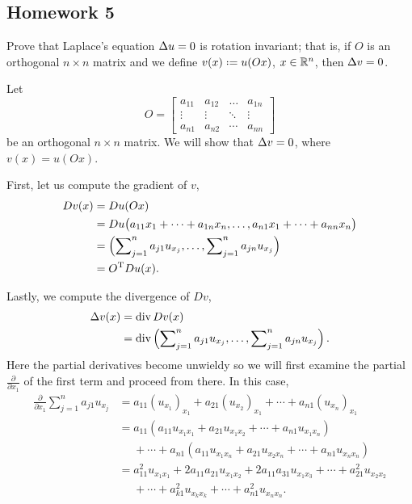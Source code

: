 \subsection{Homework 5}
\begin{problem}
  Prove that Laplace's equation \(\Delta u=0\) is rotation invariant; that
  is, if \(O\) is an orthogonal \(n\times n\) matrix and we define
  \(v(x)\defeq u(Ox)\), \(x\in\mathbb{R}^n\), then \(\Delta v=0\).
\end{problem}
\begin{solution*}
  Let
  \[
    O=
    \begin{bmatrix}
      a_{11}&a_{12}&\dotsc&a_{1n}\\
      \vdots&\vdots&\ddots&\vdots\\
      a_{n1}&a_{n2}&\cdots&a_{nn}
    \end{bmatrix}
  \]
  be an orthogonal \(n\times n\) matrix. We will show that \(\Delta v=0\),
  where \(v(x)=u(Ox)\).

  First, let us compute the gradient of \(v\),
  \begin{align*}
    Dv(x)
    &=Du(Ox)\\
    &=Du\bigl(a_{11}x_1+\dotsb+a_{1n}x_n,\dotsc,a_{n1}x_1+\dotsb+a_{nn}x_n\bigr)\\
    &=\left(\sum\nolimits_{j=1}^na_{j1}u_{x_j},%
      \dotsc,%
      \sum\nolimits_{j=1}^n a_{jn}u_{x_j}\right)\\
    &=O^\rmT Du(x).
  \end{align*}

  Lastly, we compute the divergence of \(Dv\),
  \begin{align*}
    \Lap v(x)
    &=\Div Dv(x)\\
    &=\Div%
      \left(\sum\nolimits_{j=1}^na_{j1}u_{x_j},%
      \dotsc,%
      \sum\nolimits_{j=1}^n a_{jn}u_{x_j}\right).
  \end{align*}
  Here the partial derivatives become unwieldy so we will first examine the
  partial \(\frac{\partial}{\partial x_1}\) of the first term and proceed
  from there. In this case,
  \begin{align*}
    \frac{\partial}{\partial x_1}\sum_{j=1}^n a_{j1}u_{x_j}
    &=a_{11}(u_{x_1})_{x_1}%
      +a_{21}(u_{x_2})_{x_1}%
      +\dotsb%
      +a_{n1}(u_{x_n})_{x_1}\\
    &=a_{11}(a_{11}u_{x_1x_1}+a_{21}u_{x_1x_2}+\dotsb+a_{n1}u_{x_1x_n})\\
    &\phantom{{}={}}+\dotsb+a_{n1}(a_{11}u_{x_1x_n}+a_{21}u_{x_2x_n}%
      +\dotsb+a_{n1}u_{x_nx_n})\\
    &=a_{11}^2u_{x_1x_1}+2a_{11}a_{21}u_{x_1x_2}+2a_{11}a_{31}u_{x_1x_3}
      +\dotsb+a_{21}^2u_{x_2x_2}\\
    &\phantom{{}={}}+\dotsb+a_{k1}^2u_{x_kx_k}+\dotsb+a_{n1}^2u_{x_nx_n}.
  \end{align*}


\end{solution*}

